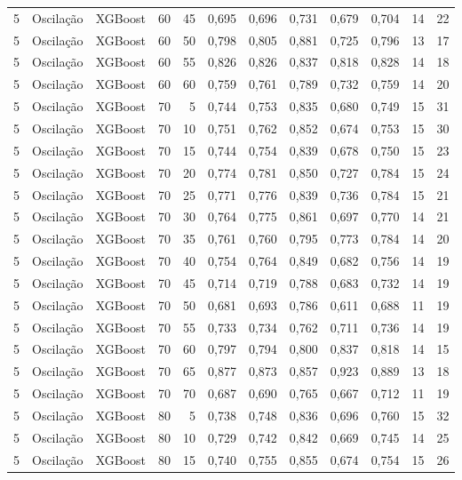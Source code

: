 \begin{longtable}{@{}rllrrrrrrrrr@{}}
5 & Oscilação & XGBoost & 60 & 45 & 0,695 & 0,696 & 0,731 & 0,679 & 0,704 & 14 & 22 \\
5 & Oscilação & XGBoost & 60 & 50 & 0,798 & 0,805 & 0,881 & 0,725 & 0,796 & 13 & 17 \\
5 & Oscilação & XGBoost & 60 & 55 & 0,826 & 0,826 & 0,837 & 0,818 & 0,828 & 14 & 18 \\
5 & Oscilação & XGBoost & 60 & 60 & 0,759 & 0,761 & 0,789 & 0,732 & 0,759 & 14 & 20 \\
5 & Oscilação & XGBoost & 70 & 5 & 0,744 & 0,753 & 0,835 & 0,680 & 0,749 & 15 & 31 \\
5 & Oscilação & XGBoost & 70 & 10 & 0,751 & 0,762 & 0,852 & 0,674 & 0,753 & 15 & 30 \\
5 & Oscilação & XGBoost & 70 & 15 & 0,744 & 0,754 & 0,839 & 0,678 & 0,750 & 15 & 23 \\
5 & Oscilação & XGBoost & 70 & 20 & 0,774 & 0,781 & 0,850 & 0,727 & 0,784 & 15 & 24 \\
5 & Oscilação & XGBoost & 70 & 25 & 0,771 & 0,776 & 0,839 & 0,736 & 0,784 & 15 & 21 \\
5 & Oscilação & XGBoost & 70 & 30 & 0,764 & 0,775 & 0,861 & 0,697 & 0,770 & 14 & 21 \\
5 & Oscilação & XGBoost & 70 & 35 & 0,761 & 0,760 & 0,795 & 0,773 & 0,784 & 14 & 20 \\
5 & Oscilação & XGBoost & 70 & 40 & 0,754 & 0,764 & 0,849 & 0,682 & 0,756 & 14 & 19 \\
5 & Oscilação & XGBoost & 70 & 45 & 0,714 & 0,719 & 0,788 & 0,683 & 0,732 & 14 & 19 \\
5 & Oscilação & XGBoost & 70 & 50 & 0,681 & 0,693 & 0,786 & 0,611 & 0,688 & 11 & 19 \\
5 & Oscilação & XGBoost & 70 & 55 & 0,733 & 0,734 & 0,762 & 0,711 & 0,736 & 14 & 19 \\
5 & Oscilação & XGBoost & 70 & 60 & 0,797 & 0,794 & 0,800 & 0,837 & 0,818 & 14 & 15 \\
5 & Oscilação & XGBoost & 70 & 65 & 0,877 & 0,873 & 0,857 & 0,923 & 0,889 & 13 & 18 \\
5 & Oscilação & XGBoost & 70 & 70 & 0,687 & 0,690 & 0,765 & 0,667 & 0,712 & 11 & 19 \\
5 & Oscilação & XGBoost & 80 & 5 & 0,738 & 0,748 & 0,836 & 0,696 & 0,760 & 15 & 32 \\
5 & Oscilação & XGBoost & 80 & 10 & 0,729 & 0,742 & 0,842 & 0,669 & 0,745 & 14 & 25 \\
5 & Oscilação & XGBoost & 80 & 15 & 0,740 & 0,755 & 0,855 & 0,674 & 0,754 & 15 & 26 \\

\end{longtable}
